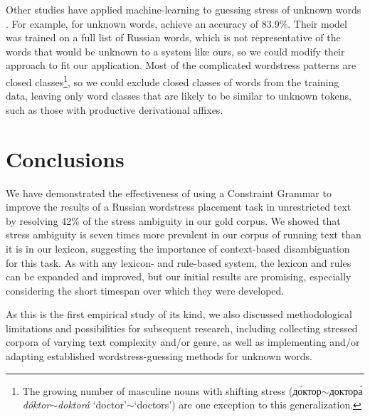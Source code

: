 \documentclass[11pt]{article}
\newcommand{\rus}[1]{\foreignlanguage{russian}{#1}}
\newcommand{\rr}[1]{\marginpar{\scriptsize R: #1}} %
\begin{document}
Other studies have applied machine-learning to guessing stress of unknown words
\cite{Pearson.ea-00,Webster-04,Dou.ea-09,hall_sproat_russian_2013}. For example,
for unknown words,  achieve an accuracy of 
83.9\%. Their model was trained on a full list of 
Russian words, which is not representative of the words that would be unknown to 
a system like ours, so we could modify their approach to fit our application. 
Most of the complicated wordstress patterns are closed 
classes\footnote{The growing number of masculine nouns with shifting stress 
(\rus{д\'{о}ктор}$\sim$\rus{доктор\'{а}} \emph{d\'{o}ktor$\sim$doktor\'{a}} 
`doctor'$\sim$`doctors') are one exception to this generalization.},
so we could exclude closed classes of words from the training data, leaving only
word classes that are likely to be similar to unknown tokens, such as those with 
productive derivational affixes.

\section{Conclusions}

We have demonstrated the effectiveness of using a Constraint Grammar to improve
the results of a Russian wordstress placement task in unrestricted text by 
resolving 42\% of the stress ambiguity in our gold corpus. We showed
that stress ambiguity is seven times more prevalent in our corpus of running text
than it is in our lexicon, suggesting the importance of context-based
disambiguation for this task.  As with any 
lexicon- and rule-based system, the lexicon and rules can be expanded and 
improved, but our initial results are promising, especially considering the short 
timespan over which they were developed.

As this is the first empirical study of its kind, we also discussed 
methodological limitations and possibilities for subsequent research, including
collecting stressed corpora of varying text complexity and/or genre, as well as
implementing and/or adapting established wordstress-guessing methods for unknown 
words.

%



\end{document}
